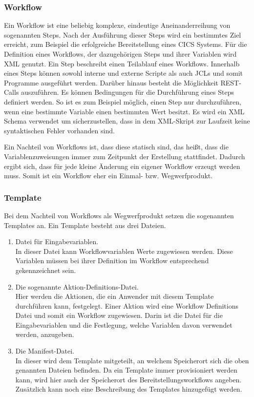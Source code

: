 \subsubsection{Workflow}\label{sssec:workflow}
Ein Workflow ist eine beliebig komplexe, eindeutige Aneinanderreihung von sogenannten Steps.
Nach der Ausführung dieser Steps wird ein bestimmtes Ziel erreicht, zum Beispiel die erfolgreiche Bereitstellung eines CICS Systems.
Für die Definition eines Workflows, der dazugehörigen Steps und ihrer Variablen wird XML genutzt.
Ein Step beschreibt einen Teilablauf eines Workflows.
Innerhalb eines Steps können sowohl interne und externe Scripte als auch JCLs und somit Programme ausgeführt werden.
Darüber hinaus besteht die Möglichkeit REST-Calls auszuführen.
Es können Bedingungen für die Durchführung eines Steps definiert werden.
So ist es zum Beispiel möglich, einen Step nur durchzuführen, wenn eine bestimmte Variable einen bestimmten Wert besitzt.
Es wird ein XML Schema verwendet um sicherzustellen, dass in dem XML-Skript zur Laufzeit keine syntaktischen Fehler vorhanden sind.
\cite{Rotthove.2018}

Ein Nachteil von Workflows ist, dass diese statisch sind, das heißt, dass die Variablenzuweisungen immer zum Zeitpunkt der Erstellung stattfindet.
Dadurch ergibt sich, dass für jede kleine Änderung ein eigener Workflow erzeugt werden muss.
Somit ist ein Workflow eher ein Einmal- bzw. Wegwerfprodukt.

\subsubsection{Template}
Bei dem Nachteil von Workflows als Wegwerfprodukt setzen die sogenannten Templates an.
Ein Template besteht aus drei Dateien.

\begin{enumerate}
\item Datei für Eingabevariablen.\\
In dieser Datei kann Workflowvariablen Werte zugewiesen werden.
Diese Variablen müssen bei ihrer Definition im Workflow entsprechend gekennzeichnet sein.

\item Die sogenannte Aktion-Definitions-Datei.\\
Hier werden die Aktionen, die ein Anwender mit diesem Template durchführen kann, festgelegt.
Einer Aktion wird eine Workflow Definitions Datei und somit ein Workflow zugewiesen.
Darin ist die Datei für die Eingabevariablen und die Festlegung, welche Variablen davon verwendet werden, anzugeben.

\item Die Manifest-Datei.\\
In dieser wird dem Template mitgeteilt, an welchem Speicherort sich die oben genannten Dateien befinden.
Da ein Template immer provisioniert werden kann, wird hier auch der Speicherort des Bereitstellungsworkflows angeben.
Zusätzlich kann noch eine Beschreibung des Templates hinzugefügt werden.
\end{enumerate}

